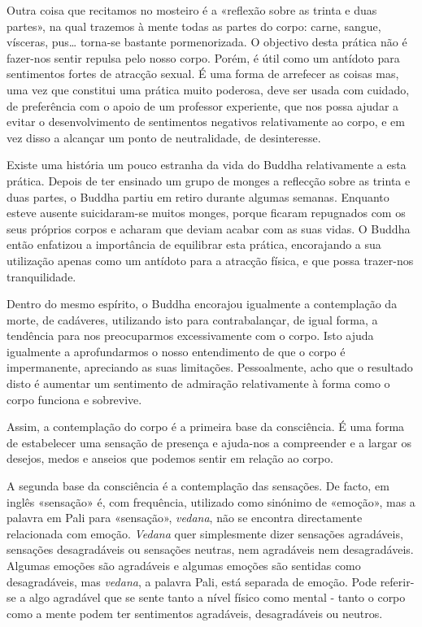 Outra coisa que recitamos no mosteiro é a «reflexão sobre as trinta e
duas partes», na qual trazemos à mente todas as partes do corpo: carne,
sangue, vísceras, pus\ldots{} torna-se bastante pormenorizada. O
objectivo desta prática não é fazer-nos sentir repulsa pelo nosso corpo.
Porém, é útil como um antídoto para sentimentos fortes de atracção
sexual. É uma forma de arrefecer as coisas mas, uma vez que constitui
uma prática muito poderosa, deve ser usada com cuidado, de preferência
com o apoio de um professor experiente, que nos possa ajudar a evitar o
desenvolvimento de sentimentos negativos relativamente ao corpo, e em
vez disso a alcançar um ponto de neutralidade, de desinteresse.

Existe uma história um pouco estranha da vida do Buddha relativamente a
esta prática. Depois de ter ensinado um grupo de monges a reflecção
sobre as trinta e duas partes, o Buddha partiu em retiro durante algumas
semanas. Enquanto esteve ausente suicidaram-se muitos monges, porque
ficaram repugnados com os seus próprios corpos e acharam que deviam
acabar com as suas vidas. O Buddha então enfatizou a importância de
equilibrar esta prática, encorajando a sua utilização apenas como um
antídoto para a atracção física, e que possa trazer-nos tranquilidade.

Dentro do mesmo espírito, o Buddha encorajou igualmente a contemplação
da morte, de cadáveres, utilizando isto para contrabalançar, de igual
forma, a tendência para nos preocuparmos excessivamente com o corpo.
Isto ajuda igualmente a aprofundarmos o nosso entendimento de que o
corpo é impermanente, apreciando as suas limitações. Pessoalmente, acho
que o resultado disto é aumentar um sentimento de admiração
relativamente à forma como o corpo funciona e sobrevive.

Assim, a contemplação do corpo é a primeira base da consciência. É uma
forma de estabelecer uma sensação de presença e ajuda-nos a compreender
e a largar os desejos, medos e anseios que podemos sentir em relação ao
corpo.

A segunda base da consciência é a contemplação das sensações. De facto,
em inglês «sensação» é, com frequência, utilizado como sinónimo de
«emoção», mas a palavra em Pali para «sensação», \emph{vedana}, não se
encontra directamente relacionada com emoção. \emph{Vedana} quer
simplesmente dizer sensações agradáveis, sensações desagradáveis ou
sensações neutras, nem agradáveis nem desagradáveis. Algumas emoções são
agradáveis e algumas emoções são sentidas como desagradáveis, mas
\emph{vedana}, a palavra Pali, está separada de emoção. Pode referir-se
a algo agradável que se sente tanto a nível físico como mental - tanto o
corpo como a mente podem ter sentimentos agradáveis, desagradáveis ou
neutros.


